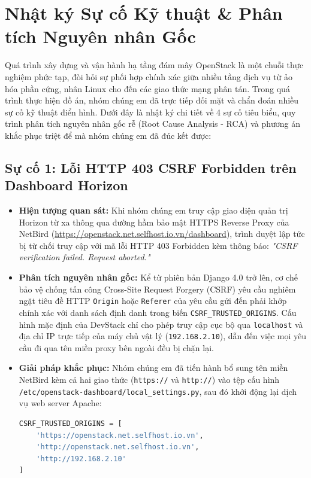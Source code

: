 \section{Nhật ký Sự cố Kỹ thuật \& Phân tích Nguyên nhân Gốc}

Quá trình xây dựng và vận hành hạ tầng đám mây OpenStack là một chuỗi thực nghiệm phức tạp, đòi hỏi sự phối hợp chính xác giữa nhiều tầng dịch vụ từ ảo hóa phần cứng, nhân Linux cho đến các giao thức mạng phân tán. Trong quá trình thực hiện đồ án, nhóm chúng em đã trực tiếp đối mặt và chẩn đoán nhiều sự cố kỹ thuật điển hình. Dưới đây là nhật ký chi tiết về 4 sự cố tiêu biểu, quy trình phân tích nguyên nhân gốc rễ (Root Cause Analysis - RCA) và phương án khắc phục triệt để mà nhóm chúng em đã đúc kết được:

\subsection{Sự cố 1: Lỗi HTTP 403 CSRF Forbidden trên Dashboard Horizon}
\begin{itemize}
    \item \textbf{Hiện tượng quan sát:} Khi nhóm chúng em truy cập giao diện quản trị Horizon từ xa thông qua đường hầm bảo mật HTTPS Reverse Proxy của NetBird (\url{https://openstack.net.selfhost.io.vn/dashboard}), trình duyệt lập tức bị từ chối truy cập với mã lỗi HTTP 403 Forbidden kèm thông báo: \textit{"CSRF verification failed. Request aborted."}
    \item \textbf{Phân tích nguyên nhân gốc:} Kể từ phiên bản Django 4.0 trở lên, cơ chế bảo vệ chống tấn công Cross-Site Request Forgery (CSRF) yêu cầu nghiêm ngặt tiêu đề HTTP \texttt{Origin} hoặc \texttt{Referer} của yêu cầu gửi đến phải khớp chính xác với danh sách định danh trong biến \texttt{CSRF\_TRUSTED\_ORIGINS}. Cấu hình mặc định của DevStack chỉ cho phép truy cập cục bộ qua \texttt{localhost} và địa chỉ IP trực tiếp của máy chủ vật lý (\texttt{192.168.2.10}), dẫn đến việc mọi yêu cầu đi qua tên miền proxy bên ngoài đều bị chặn lại.
    \item \textbf{Giải pháp khắc phục:} Nhóm chúng em đã tiến hành bổ sung tên miền NetBird kèm cả hai giao thức (\texttt{https://} và \texttt{http://}) vào tệp cấu hình \nolinkurl{/etc/openstack-dashboard/local_settings.py}, sau đó khởi động lại dịch vụ web server Apache:
\begin{lstlisting}[language=python]
CSRF_TRUSTED_ORIGINS = [
    'https://openstack.net.selfhost.io.vn',
    'http://openstack.net.selfhost.io.vn',
    'http://192.168.2.10'
]
\end{lstlisting}
\end{itemize}

